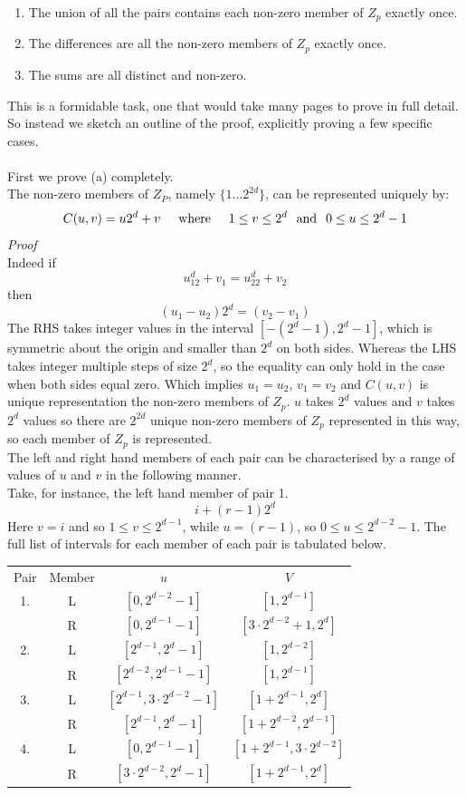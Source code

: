 \documentclass[
  12pt,
  a4paper]{book}
\begin{document}
\begin{enumerate}
\def\labelenumi{\arabic{enumi}.}
\item
  The union of all the pairs contains each non-zero member of \(Z_p\)
  exactly once.
\item
  The differences are all the non-zero members of \(Z_p\) exactly once.
\item
  The sums are all distinct and non-zero.
\end{enumerate}

This is a formidable task, one that would take many pages to prove in
full detail. So instead we sketch an outline of the proof, explicitly
proving a few specific cases.\\
~\\
First we prove (a) completely.\\
The non-zero members of \(Z_P\), namely \(\{1...2^{2d}\}\), can be
represented uniquely by:
\[C(u,v) = u2^d+v \hspace{0.5cm} \mathrm{where} \hspace{0.5cm} 1 \leq v \leq 2^d
\hspace{0.25cm} \mathrm{and} \hspace{0.25cm} 0 \leq u \leq 2^d-1\]
\emph{Proof}\\
Indeed if \[u_12^d+v_1=u_22^d+v_2\] then \[(u_1-u_2)2^d=(v_2-v_1)\] The
RHS takes integer values in the interval \([-(2^d-1),2^d-1]\), which is
symmetric about the origin and smaller than \(2^d\) on both sides.
Whereas the LHS takes integer multiple steps of size \(2^d\), so the
equality can only hold in the case when both sides equal zero. Which
implies \(u_1=u_2\), \(v_1=v_2\) and \(C(u,v)\) is unique representation
the non-zero members of \(Z_p\). \(u\) takes \(2^d\) values and \(v\)
takes \(2^d\) values so there are \(2^{2d}\) unique non-zero members of
\(Z_p\) represented in this way, so each member of \(Z_p\) is
represented.\\
The left and right hand members of each pair can be characterised by a
range of values of \(u\) and \(v\) in the following manner.\\
Take, for instance, the left hand member of pair 1. \[i+(r-1)2^d\] Here
\(v=i\) and so \(1 \leq v \leq 2^{d-1}\), while \(u=(r-1)\), so
\(0 \leq u \leq 2^{d-2}-1\). The full list of intervals for each member
of each pair is tabulated below.

\begin{longtable}[]{@{}cccc@{}}
\toprule
\endhead
Pair & Member & \(u\) & \(V\)\tabularnewline
1. & L & \([0,2^{d-2}-1]\) & \([1,2^{d-1}]\)\tabularnewline
& R & \([0,2^{d-1}-1]\) & \([3 \cdot 2^{d-2}+1,2^{d}]\)\tabularnewline
2. & L & \([2^{d-1},2^{d}-1]\) & \([1,2^{d-2}]\)\tabularnewline
& R & \([2^{d-2},2^{d-1}-1]\) & \([1,2^{d-1}]\)\tabularnewline
3. & L & \([2^{d-1},3 \cdot 2^{d-2}-1]\) &
\([1+2^{d-1},2^{d}]\)\tabularnewline
& R & \([2^{d-1},2^{d}-1]\) & \([1+ 2^{d-2},2^{d-1}]\)\tabularnewline
4. & L & \([0,2^{d-1}-1]\) &
\([1+ 2^{d-1},3 \cdot 2^{d-2}]\)\tabularnewline
& R & \([3 \cdot 2^{d-2},2^{d}-1]\) &
\([1+2^{d-1},2^{d}]\)\tabularnewline
\bottomrule
\end{longtable}
\end{document}
